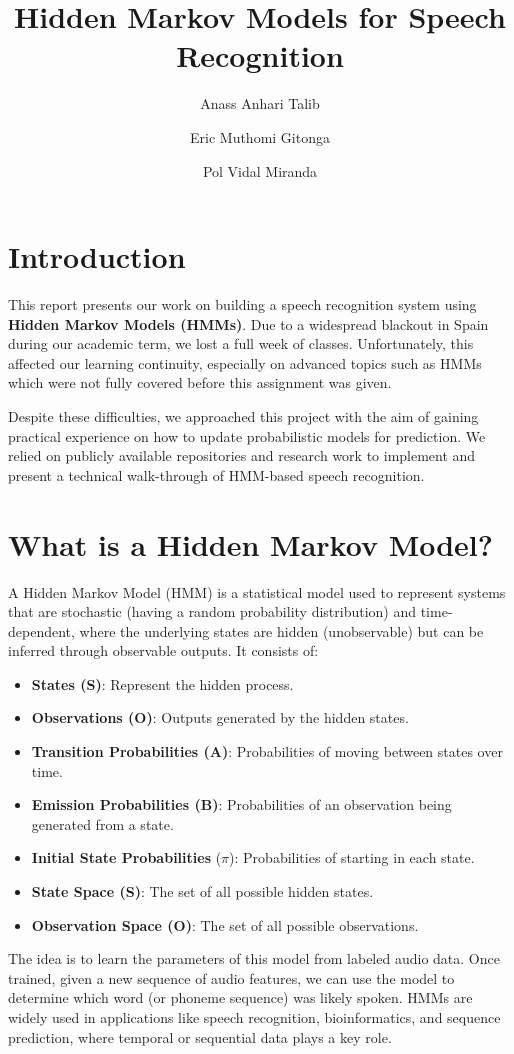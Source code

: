 \documentclass[informe,english]{practicaitic}
\title{Hidden Markov Models for Speech Recognition}
\author{Anass Anhari Talib \and Eric Muthomi Gitonga \and Pol Vidal Miranda}
\begin{document}
\section{Introduction}
    
    This report presents our work on building a speech recognition system using \textbf{Hidden Markov Models (HMMs)}. Due to a widespread blackout in Spain during our academic term, we lost a full week of classes. Unfortunately, this affected our learning continuity, especially on advanced topics such as HMMs which were not fully covered before this assignment was given.
    
    Despite these difficulties, we approached this project with the aim of gaining practical experience on how to update probabilistic models for prediction. We relied on publicly available repositories and research work to implement and present a technical walk-through of HMM-based speech recognition.
    
\section{What is a Hidden Markov Model?}
    A Hidden Markov Model (HMM) is a statistical model used to represent systems that are stochastic (having a random probability distribution) and time-dependent, where the underlying states are hidden (unobservable) but can be inferred through observable outputs. It consists of:
    
    \begin{itemize}
        \item \textbf{States (S)}: Represent the hidden process.
        \item \textbf{Observations (O)}: Outputs generated by the hidden states.
        \item \textbf{Transition Probabilities (A)}: Probabilities of moving between states over time.
        \item \textbf{Emission Probabilities (B)}: Probabilities of an observation being generated from a state.
        \item \textbf{Initial State Probabilities} ($\pi$): Probabilities of starting in each state.
        \item \textbf{State Space (S)}: The set of all possible hidden states.
        \item \textbf{Observation Space (O)}: The set of all possible observations.
    \end{itemize}
     
    The idea is to learn the parameters of this model from labeled audio data. Once trained, given a new sequence of audio features, we can use the model to determine which word (or phoneme sequence) was likely spoken. HMMs are widely used in applications like speech recognition, bioinformatics, and sequence prediction, where temporal or sequential data plays a key role.
    
\end{document}
